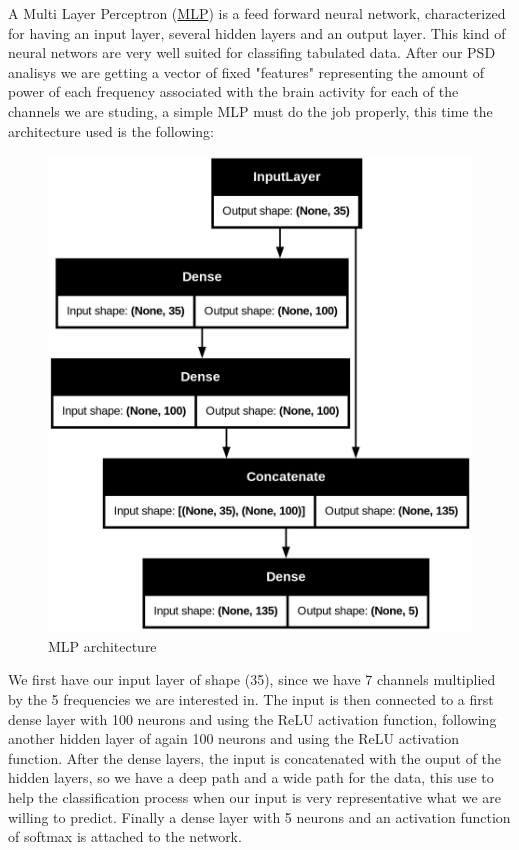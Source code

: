 A Multi Layer Perceptron (\href{https://en.wikipedia.org/wiki/Multilayer_perceptron}{MLP}) is a feed forward neural network, characterized for having an input layer, several hidden layers and an output layer. This kind of neural networs are very well suited for classifing tabulated data. After our PSD analisys we are getting a vector of fixed "features" representing the amount of power of each frequency associated with the brain activity for each of the channels we are studing, a simple MLP must do the job properly, this time the architecture used is the following:

\begin{figure}[H]
\centering
\includegraphics[scale=.2, angle=90]{figs/mlp.png}
\caption{MLP architecture}
\label{fig3}
\end{figure}

We first have our input layer of shape (35), since we have 7 channels multiplied by the 5 frequencies we are interested in. The input is then connected to a first dense layer with 100 neurons and using the ReLU activation function, following another hidden layer of again 100 neurons and using the ReLU activation function. After the dense layers, the input is concatenated with the ouput of the hidden layers, so we have a deep path and a wide path for the data, this use to help the classification process when our input is very representative what we are willing to predict. Finally a dense layer with 5 neurons and an activation function of softmax is attached to the network.


